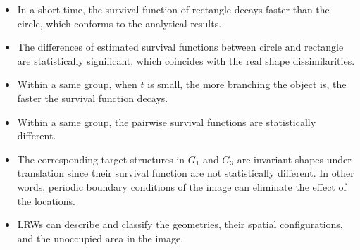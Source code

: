       \begin{itemize}
         \item In a short time, the survival function of rectangle decays faster than the circle, which conforms to the analytical results.
  
         \item The differences of estimated survival functions between circle and rectangle are statistically significant, which coincides with the real shape dissimilarities.

         \item Within a same group, when $t$ is small, the more branching the object is, the faster the survival function decays.

         \item Within a same group, the pairwise survival functions are statistically different.

         \item The corresponding target structures in $G_1$ and $G_3$ are invariant shapes under translation since their survival function are not statistically different. In other words, periodic boundary conditions of the image can eliminate the effect of the locations.

         \item LRWs can describe and classify the geometries, their spatial configurations, and the unoccupied area in the image.
    \end{itemize}




